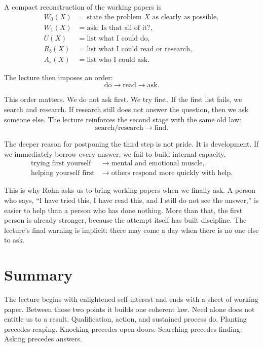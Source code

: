 A compact reconstruction of the working papers is
\begin{align}
W_0(X) &= \text{state the problem } X \text{ as clearly as possible}, \\
W_1(X) &= \text{ask: Is that all of it?}, \\
U(X) &= \text{list what I could do}, \\
R_b(X) &= \text{list what I could read or research}, \\
A_s(X) &= \text{list who I could ask}.
\end{align}

The lecture then imposes an order:
\begin{equation}
\text{do} \rightarrow \text{read} \rightarrow \text{ask}.
\end{equation}

This order matters. We do not ask first. We try first. If the first list fails, we search and research. If research still does not answer the question, then we ask someone else. The lecture reinforces the second stage with the same old law:
\begin{equation}
\text{search/research} \rightarrow \text{find}.
\end{equation}

The deeper reason for postponing the third step is not pride. It is development. If we immediately borrow every answer, we fail to build internal capacity.
\begin{align}
\text{trying first yourself} &\rightarrow \text{mental and emotional muscle}, \\
\text{helping yourself first} &\rightarrow \text{others respond more quickly with help}.
\end{align}

This is why Rohn asks us to bring working papers when we finally ask. A person who says, ``I have tried this, I have read this, and I still do not see the answer,'' is easier to help than a person who has done nothing. More than that, the first person is already stronger, because the attempt itself has built discipline. The lecture's final warning is implicit: there may come a day when there is no one else to ask.

\section{Summary}

The lecture begins with enlightened self-interest and ends with a sheet of working paper. Between those two points it builds one coherent law. Need alone does not entitle us to a result. Qualification, action, and sustained process do. Planting precedes reaping. Knocking precedes open doors. Searching precedes finding. Asking precedes answers.

